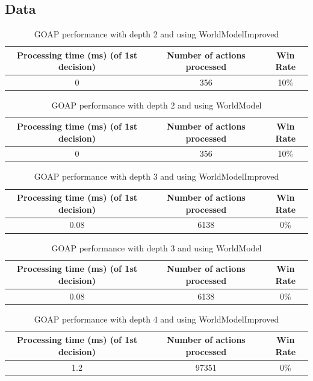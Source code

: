 \documentclass{article}
\begin{document}
  \subsection{Data}
  \begin{table}[h!]
    \centering
    \caption{GOAP performance with depth 2 and using WorldModelImproved}
    \label{tab:tableGOAP1}
    \begin{tabular}{c|c|c}
      \textbf{Processing time (ms) (of 1st decision)} & \textbf{Number of actions processed} & \textbf{Win Rate}\\
      \hline
      0 & 356 & 10\%
    \end{tabular}
  \end{table}
  \begin{table}[h!]
    \centering
    \caption{GOAP performance with depth 2 and using WorldModel}
    \label{tab:tableGOAP2}
    \begin{tabular}{c|c|c}
      \textbf{Processing time (ms) (of 1st decision)} & \textbf{Number of actions processed} & \textbf{Win Rate}\\
      \hline
      0 & 356 & 10\%
    \end{tabular}
  \end{table}
  \begin{table}[h!]
    \centering
    \caption{GOAP performance with depth 3 and using WorldModelImproved}
    \label{tab:tableGOAP3}
    \begin{tabular}{c|c|c}
      \textbf{Processing time (ms) (of 1st decision)} & \textbf{Number of actions processed} & \textbf{Win Rate}\\
      \hline
      0.08 & 6138 & 0\%
    \end{tabular}
  \end{table}
  \begin{table}[h!]
    \centering
    \caption{GOAP performance with depth 3 and using WorldModel}
    \label{tab:tableGOAP4}
    \begin{tabular}{c|c|c}
      \textbf{Processing time (ms) (of 1st decision)} & \textbf{Number of actions processed} & \textbf{Win Rate}\\
      \hline
      0.08 & 6138 & 0\%
    \end{tabular}
  \end{table}
  \begin{table}[h!]
    \centering
    \caption{GOAP performance with depth 4 and using WorldModelImproved}
    \label{tab:tableGOAP5}
    \begin{tabular}{c|c|c}
      \textbf{Processing time (ms) (of 1st decision)} & \textbf{Number of actions processed} & \textbf{Win Rate}\\
      \hline
      1.2 & 97351 & 0\%
    \end{tabular}
  \end{table}
\end{document}
